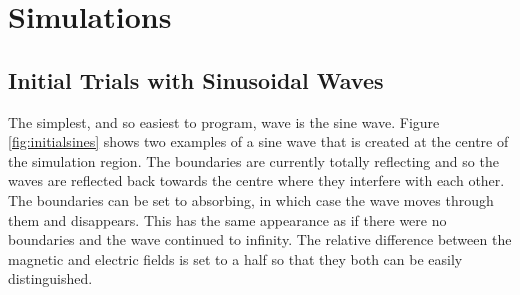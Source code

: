 
\section{Simulations} %
\label{sec:simulations}

\subsection{Initial Trials with Sinusoidal Waves} %
\label{ssub:initial_trials_with_sinusoidal_waves}
The simplest, and so easiest to program, wave is the sine wave. Figure \ref{fig:initialsines} shows two examples of a sine wave that is created at the centre of the simulation region. The boundaries are currently totally reflecting and so the waves are reflected back towards the centre where they interfere with each other. The boundaries can be set to absorbing, in which case the wave moves through them and disappears. This has the same appearance as if there were no boundaries and the wave continued to infinity. The relative difference between the magnetic and electric fields is set to a half so that they both can be easily distinguished.
